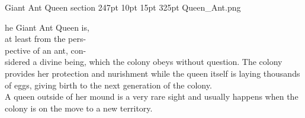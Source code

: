 \def\primarycolor{titlered}%
\def\secondarycolor{white}%
\MonsterBannerGraphic%
	{Giant Ant Queen} %
	{section} %
	{247pt} %
	{10pt} %
	{15pt} %
	{325pt} %
	{Queen_Ant.png} %
	{} %
%
\vspace{13pt}
\entryfont \noindent {}he Giant Ant Queen is,\\
at least from the pers-\\
pective of an ant, con-\\
sidered a divine being, which the colony obeys without question. The colony provides her protection and nurishment while the queen itself is laying thousands of eggs, giving birth to the next generation of the colony.\\
A queen outside of her mound is a very rare sight and usually happens when the colony is on the move to a new territory.


